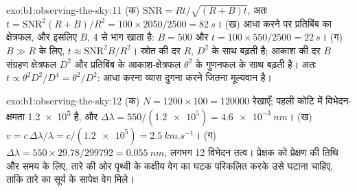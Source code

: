 \begin{solution}{exo:b1:observing-the-sky:11}
(क) $\mathrm{SNR} = Rt/\sqrt{(R + B)t}$, अतः $t = \mathrm{SNR}^2(R + B)/R^2
= 100\times2050/2500 = \qty{82}{s}$। (ख)  आधा करने पर प्रतिबिंब का क्षेत्रफल, और इसलिए
$B$, 4 से भाग खाता है: $B = 500$ और $t = 100\times550/2500 =
\qty{22}{s}$। (ग) $B \gg R$ के लिए, $t \approx \mathrm{SNR}^2B/R^2$। स्रोत की दर $R$, $D^2$ के
साथ बढ़ती है; आकाश की दर $B$ संग्रहण क्षेत्रफल $D^2$ और प्रतिबिंब के आकाश-क्षेत्रफल $\theta^2$ के
गुणनफल के साथ बढ़ती है। अतः $t \propto
\theta^2D^2/D^4 = \theta^2/D^2$:  आधा करना व्यास दुगना करने जितना मूल्यवान है।
\end{solution}

\begin{solution}{exo:b1:observing-the-sky:12}
(क) $N = 1200\times100 = \num{120000}$ रेखाएँ; पहली कोटि में विभेदन-क्षमता \num{1.2e5} है, और
$\Delta\lambda = 550/(\num{1.2e5}) =
\qty{4.6e-3}{nm}$। (ख) $v = c\,\Delta\lambda/\lambda = c/(\num{1.2e5}) =
\qty{2.5}{km.s^{-1}}$। (ग) $\Delta\lambda = 550\times29.78/\num{299792} =
\qty{0.055}{nm}$, लगभग 12 विभेदन तत्व। प्रेक्षक को प्रेक्षण की तिथि और समय के लिए, तारे की ओर पृथ्वी
के कक्षीय वेग का घटक परिकलित करके उसे घटाना चाहिए, ताकि तारे का सूर्य के सापेक्ष वेग मिले।
\end{solution}

